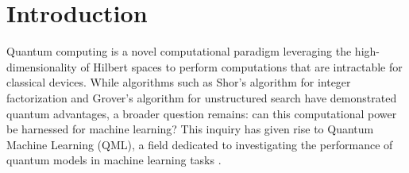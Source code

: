 \documentclass{article}
\theoremstyle{plain}
\theoremstyle{definition}
\theoremstyle{remark}
\begin{document}
\printAffiliationsAndNotice{}  %

\begin{abstract}
  Quantum machine learning (QML), as an interdisciplinary field bridging quantum computing and machine learning, has garnered significant attention in recent years. Currently, the field as a whole faces challenges due to incomplete theoretical foundations for the expressivity of quantum neural networks (QNNs). In this paper we propose a constructive QNN model and demonstrate that it possesses the universal approximation property (UAP), which means it can approximate any square-integrable function up to arbitrary accuracy. Furthermore, it supports switching function bases, thus adaptable to various scenarios in numerical approximation and machine learning. Our model has asymptotic advantages over the best classical feed-forward neural networks in terms of circuit size and achieves optimal parameter complexity when approximating Sobolev functions under $L_2$ norm.
\end{abstract}

\section{Introduction}
Quantum computing is a novel computational paradigm leveraging the high-dimensionality of Hilbert spaces to perform computations that are intractable for classical devices. While algorithms such as Shor's algorithm for integer factorization  and Grover's algorithm for unstructured search  have demonstrated quantum advantages, a broader question remains: can this computational power be harnessed for machine learning? This inquiry has given rise to Quantum Machine Learning (QML), a field dedicated to investigating the performance of quantum models in machine learning tasks \cite{Schuld2015,QML2017,Dallaire2018,Schuld2020,Cerezo2021,Huang2021,yan25}.
\end{document}
